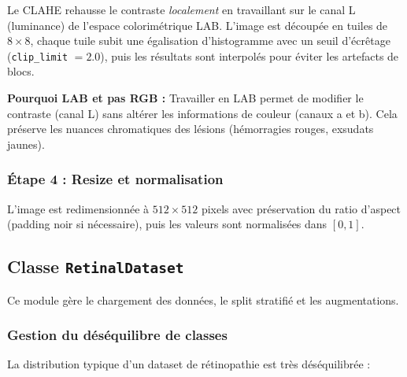 ﻿\documentclass[11pt,a4paper]{article}
\begin{document}
Le CLAHE rehausse le contraste \emph{localement} en travaillant sur le canal L (luminance) de l'espace colorimétrique LAB. L'image est découpée en tuiles de $8 \times 8$, chaque tuile subit une égalisation d'histogramme avec un seuil d'écrêtage (\texttt{clip\_limit} $= 2.0$), puis les résultats sont interpolés pour éviter les artefacts de blocs.

\textbf{Pourquoi LAB et pas RGB :} Travailler en LAB permet de modifier le contraste (canal L) sans altérer les informations de couleur (canaux a et b). Cela préserve les nuances chromatiques des lésions (hémorragies rouges, exsudats jaunes).

\subsubsection{Étape 4 : Resize et normalisation}

L'image est redimensionnée à $512 \times 512$ pixels avec préservation du ratio d'aspect (padding noir si nécessaire), puis les valeurs sont normalisées dans $[0, 1]$.

\subsection{Classe \texttt{RetinalDataset}}

Ce module gère le chargement des données, le split stratifié et les augmentations.

\subsubsection{Gestion du déséquilibre de classes}

La distribution typique d'un dataset de rétinopathie est très déséquilibrée :

\begin{center}
\end{center}
\end{document}
